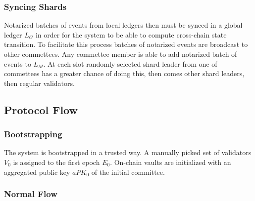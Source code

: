 \subsubsection{Syncing Shards}

Notarized batches of events from local ledgers then must be synced in a global ledger $L_G$ in order for the system to be able to compute cross-chain state transition.
To facilitate this process batches of notarized events are broadcast to other commettees.
Any commettee member is able to add notarized batch of events to $L_M$.
At each slot randomly selected shard leader from one of commettees has a greater chance of doing this, then comes other shard leaders, then regular validators.

\subsection{Protocol Flow}\label{subsec:protocol-flow}

\subsubsection{Bootstrapping}\label{subsubsec:bootstrapping}

The system is bootstrapped in a trusted way.
A manually picked set of validators $V_0$ is assigned to the first epoch $E_0$.
On-chain vaults are initialized with an aggregated public key $aPK_0$ of the initial committee.

\subsubsection{Normal Flow}\label{subsubsec:normal-flow}

